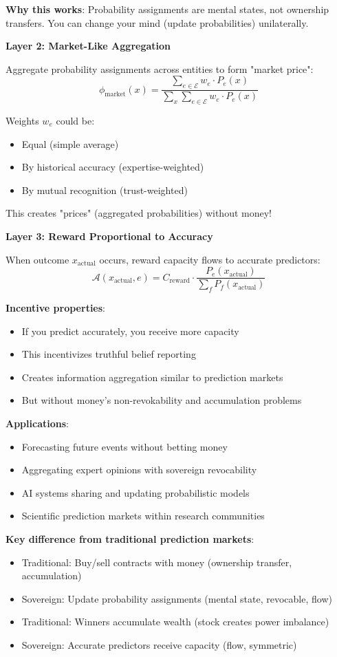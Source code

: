 \documentclass[11pt,a4paper]{article}
\theoremstyle{definition}
\theoremstyle{remark}
\newcommand{\E}{\mathcal{E}}
\newcommand{\A}{\mathcal{A}}
\begin{document}
\textbf{Why this works}: Probability assignments are mental states, not ownership transfers. You can change your mind (update probabilities) unilaterally.

\textbf{Layer 2: Market-Like Aggregation}

Aggregate probability assignments across entities to form "market price":
\[ \phi_{\text{market}}(x) = \frac{\sum_{e \in \E} w_e \cdot P_e(x)}{\sum_x \sum_{e \in \E} w_e \cdot P_e(x)} \]

Weights $w_e$ could be:
\begin{itemize}
\item Equal (simple average)
\item By historical accuracy (expertise-weighted)
\item By mutual recognition (trust-weighted)
\end{itemize}

This creates "prices" (aggregated probabilities) without money!

\textbf{Layer 3: Reward Proportional to Accuracy}

When outcome $x_{\text{actual}}$ occurs, reward capacity flows to accurate predictors:
\[ \A(x_{\text{actual}}, e) = C_{\text{reward}} \cdot \frac{P_e(x_{\text{actual}})}{\sum_f P_f(x_{\text{actual}})} \]

\textbf{Incentive properties}:
\begin{itemize}
\item If you predict accurately, you receive more capacity
\item This incentivizes truthful belief reporting
\item Creates information aggregation similar to prediction markets
\item But without money's non-revokability and accumulation problems
\end{itemize}

\textbf{Applications}:
\begin{itemize}
\item Forecasting future events without betting money
\item Aggregating expert opinions with sovereign revocability
\item AI systems sharing and updating probabilistic models
\item Scientific prediction markets within research communities
\end{itemize}

\textbf{Key difference from traditional prediction markets}:
\begin{itemize}
\item Traditional: Buy/sell contracts with money (ownership transfer, accumulation)
\item Sovereign: Update probability assignments (mental state, revocable, flow)
\item Traditional: Winners accumulate wealth (stock creates power imbalance)
\item Sovereign: Accurate predictors receive capacity (flow, symmetric)
\end{itemize}
\end{document}
